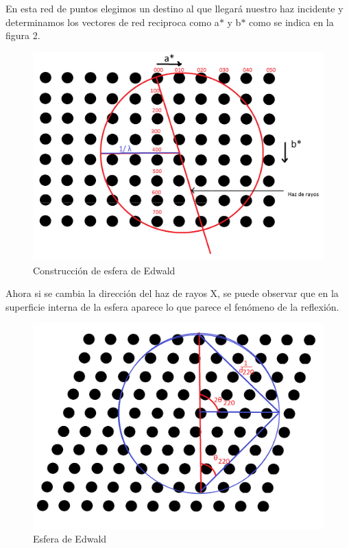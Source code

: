 \documentclass[12pt,a4paper]{article}
\begin{document}
\vspace{\baselineskip}
En esta red de puntos elegimos un destino al que llegará nuestro haz incidente y determinamos los vectores de red reciproca como a$\ast$  y b$\ast$  como se indica en la figura 2. 


\begin{figure}[H]
	\centering
		\includegraphics[scale=0.22]{2.png}
	\caption{Construcción de esfera de Edwald}
\end{figure}


Ahora si se cambia la dirección del haz de rayos X, se puede observar que en la superficie interna de la esfera aparece lo que parece el fenómeno de la reflexión.


\begin{figure}[H]
	\centering
		\includegraphics[scale=0.18]{3.png}
    \caption{Esfera de Edwald}
\end{figure}
\end{document}

